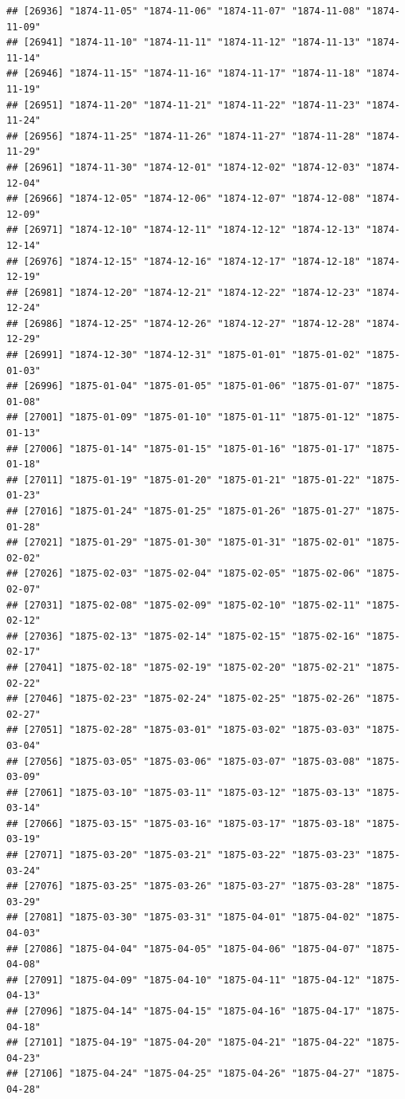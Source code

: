 \documentclass{article}\usepackage[]{graphicx}\usepackage[]{color}
\makeatletter
\newenvironment{kframe}{%
 \def\at@end@of@kframe{}%
 \ifinner\ifhmode%
  \def\at@end@of@kframe{\end{minipage}}%
  \begin{minipage}{\columnwidth}%
 \fi\fi%
 \def\FrameCommand##1{\hskip\@totalleftmargin \hskip-\fboxsep
 \colorbox{shadecolor}{##1}\hskip-\fboxsep
     \hskip-\linewidth \hskip-\@totalleftmargin \hskip\columnwidth}%
 \MakeFramed {\advance\hsize-\width
   \@totalleftmargin\z@ \linewidth\hsize
   \@setminipage}}%
 {\par\unskip\endMakeFramed%
 \at@end@of@kframe}
\newenvironment{knitrout}{}{} %
\makeatother
\begin{document}
\begin{description}
\begin{knitrout}
\begin{kframe}
\begin{verbatim}
## [26936] "1874-11-05" "1874-11-06" "1874-11-07" "1874-11-08" "1874-11-09"
## [26941] "1874-11-10" "1874-11-11" "1874-11-12" "1874-11-13" "1874-11-14"
## [26946] "1874-11-15" "1874-11-16" "1874-11-17" "1874-11-18" "1874-11-19"
## [26951] "1874-11-20" "1874-11-21" "1874-11-22" "1874-11-23" "1874-11-24"
## [26956] "1874-11-25" "1874-11-26" "1874-11-27" "1874-11-28" "1874-11-29"
## [26961] "1874-11-30" "1874-12-01" "1874-12-02" "1874-12-03" "1874-12-04"
## [26966] "1874-12-05" "1874-12-06" "1874-12-07" "1874-12-08" "1874-12-09"
## [26971] "1874-12-10" "1874-12-11" "1874-12-12" "1874-12-13" "1874-12-14"
## [26976] "1874-12-15" "1874-12-16" "1874-12-17" "1874-12-18" "1874-12-19"
## [26981] "1874-12-20" "1874-12-21" "1874-12-22" "1874-12-23" "1874-12-24"
## [26986] "1874-12-25" "1874-12-26" "1874-12-27" "1874-12-28" "1874-12-29"
## [26991] "1874-12-30" "1874-12-31" "1875-01-01" "1875-01-02" "1875-01-03"
## [26996] "1875-01-04" "1875-01-05" "1875-01-06" "1875-01-07" "1875-01-08"
## [27001] "1875-01-09" "1875-01-10" "1875-01-11" "1875-01-12" "1875-01-13"
## [27006] "1875-01-14" "1875-01-15" "1875-01-16" "1875-01-17" "1875-01-18"
## [27011] "1875-01-19" "1875-01-20" "1875-01-21" "1875-01-22" "1875-01-23"
## [27016] "1875-01-24" "1875-01-25" "1875-01-26" "1875-01-27" "1875-01-28"
## [27021] "1875-01-29" "1875-01-30" "1875-01-31" "1875-02-01" "1875-02-02"
## [27026] "1875-02-03" "1875-02-04" "1875-02-05" "1875-02-06" "1875-02-07"
## [27031] "1875-02-08" "1875-02-09" "1875-02-10" "1875-02-11" "1875-02-12"
## [27036] "1875-02-13" "1875-02-14" "1875-02-15" "1875-02-16" "1875-02-17"
## [27041] "1875-02-18" "1875-02-19" "1875-02-20" "1875-02-21" "1875-02-22"
## [27046] "1875-02-23" "1875-02-24" "1875-02-25" "1875-02-26" "1875-02-27"
## [27051] "1875-02-28" "1875-03-01" "1875-03-02" "1875-03-03" "1875-03-04"
## [27056] "1875-03-05" "1875-03-06" "1875-03-07" "1875-03-08" "1875-03-09"
## [27061] "1875-03-10" "1875-03-11" "1875-03-12" "1875-03-13" "1875-03-14"
## [27066] "1875-03-15" "1875-03-16" "1875-03-17" "1875-03-18" "1875-03-19"
## [27071] "1875-03-20" "1875-03-21" "1875-03-22" "1875-03-23" "1875-03-24"
## [27076] "1875-03-25" "1875-03-26" "1875-03-27" "1875-03-28" "1875-03-29"
## [27081] "1875-03-30" "1875-03-31" "1875-04-01" "1875-04-02" "1875-04-03"
## [27086] "1875-04-04" "1875-04-05" "1875-04-06" "1875-04-07" "1875-04-08"
## [27091] "1875-04-09" "1875-04-10" "1875-04-11" "1875-04-12" "1875-04-13"
## [27096] "1875-04-14" "1875-04-15" "1875-04-16" "1875-04-17" "1875-04-18"
## [27101] "1875-04-19" "1875-04-20" "1875-04-21" "1875-04-22" "1875-04-23"
## [27106] "1875-04-24" "1875-04-25" "1875-04-26" "1875-04-27" "1875-04-28"

\end{verbatim}
\end{kframe}
\end{knitrout}
\end{description}
\end{document}
